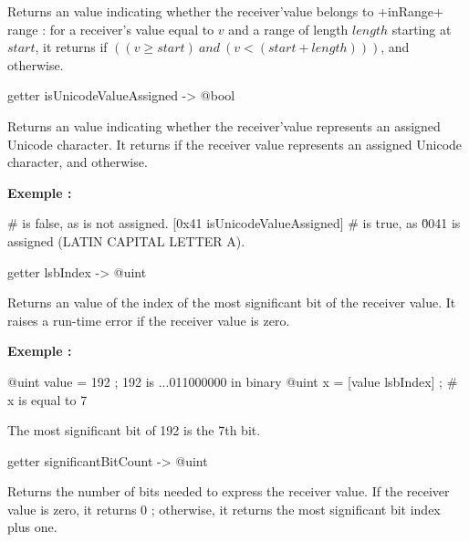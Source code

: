 {Returns an  value indicating whether the receiver'value belongs to \ggs+inRange+ range : for a receiver's value equal to $v$ and a range of length $length$ starting at $start$, it returns  if $((v \geqslant start)~and~(v<(start+length)))$, and  otherwise.




\begin{galgascode}
getter isUnicodeValueAssigned -> @bool
\end{galgascode}

Returns an  value indicating whether the receiver'value represents an assigned Unicode character. It returns  if the receiver value represents an assigned Unicode character,  and otherwise.

\textbf{Exemple :}
\begin{galgascode}
 # is false, as \uFFFF is not assigned.
[0x41 isUnicodeValueAssigned] # is true, as \u0041 is assigned (LATIN CAPITAL LETTER A).
\end{galgascode}




\begin{galgascode}
getter lsbIndex -> @uint
\end{galgascode}

Returns an  value of the index of the most significant bit of the receiver value. It raises a run-time error if the receiver value is zero.

\textbf{Exemple :}
\begin{galgascode}
@uint value = 192 ; 192 is ...011000000 in binary
@uint x = [value lsbIndex] ; # x is equal to 7
\end{galgascode}

The most significant bit of 192 is the 7th bit.





\begin{galgascode}
getter significantBitCount -> @uint
\end{galgascode}

Returns the number of bits needed to express the receiver value. If the receiver value is zero, it returns 0 ; otherwise, it returns the most significant bit index plus one.

}
